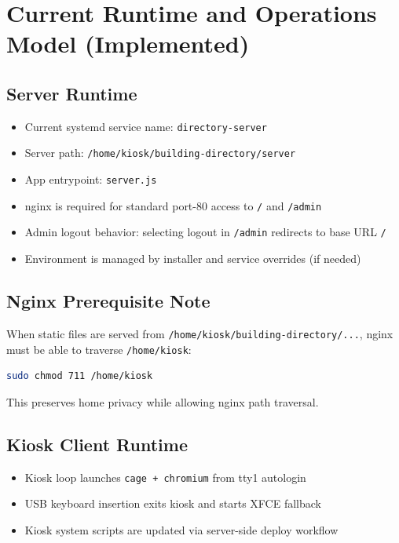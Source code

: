 \documentclass[11pt,letterpaper]{article}
\begin{document}
\section{Current Runtime and Operations Model (Implemented)}

\subsection{Server Runtime}

\begin{itemize}
\item Current systemd service name: \texttt{directory-server}
\item Server path: \texttt{/home/kiosk/building-directory/server}
\item App entrypoint: \texttt{server.js}
\item nginx is required for standard port-80 access to \texttt{/} and \texttt{/admin}
\item Admin logout behavior: selecting logout in \texttt{/admin} redirects to base URL \texttt{/}
\item Environment is managed by installer and service overrides (if needed)
\end{itemize}

\subsection{Nginx Prerequisite Note}

When static files are served from \texttt{/home/kiosk/building-directory/...}, nginx must be able to traverse \texttt{/home/kiosk}:
\begin{lstlisting}[language=bash]
sudo chmod 711 /home/kiosk
\end{lstlisting}

This preserves home privacy while allowing nginx path traversal.

\subsection{Kiosk Client Runtime}

\begin{itemize}
\item Kiosk loop launches \texttt{cage + chromium} from tty1 autologin
\item USB keyboard insertion exits kiosk and starts XFCE fallback
\item Kiosk system scripts are updated via server-side deploy workflow
\end{itemize}
\end{document}
